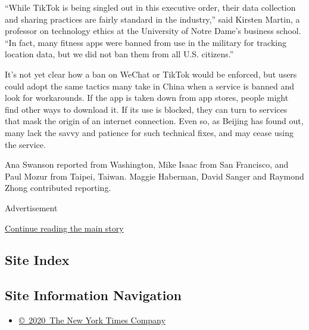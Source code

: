 ``While TikTok is being singled out in this executive order, their data
collection and sharing practices are fairly standard in the industry,''
said Kirsten Martin, a professor on technology ethics at the University
of Notre Dame's business school. ``In fact, many fitness apps were
banned from use in the military for tracking location data, but we did
not ban them from all U.S. citizens.''

It's not yet clear how a ban on WeChat or TikTok would be enforced, but
users could adopt the same tactics many take in China when a service is
banned and look for workarounds. If the app is taken down from app
stores, people might find other ways to download it. If its use is
blocked, they can turn to services that mask the origin of an internet
connection. Even so, as Beijing has found out, many lack the savvy and
patience for such technical fixes, and may cease using the service.

Ana Swanson reported from Washington, Mike Isaac from San Francisco, and
Paul Mozur from Taipei, Taiwan. Maggie Haberman, David Sanger and
Raymond Zhong contributed reporting.

Advertisement

\protect\hyperlink{after-bottom}{Continue reading the main story}

\hypertarget{site-index}{%
\subsection{Site Index}\label{site-index}}

\hypertarget{site-information-navigation}{%
\subsection{Site Information
Navigation}\label{site-information-navigation}}

\begin{itemize}
\tightlist
\item
  \href{https://help.nytimes.com/hc/en-us/articles/115014792127-Copyright-notice}{©~2020~The
  New York Times Company}
\end{itemize}

